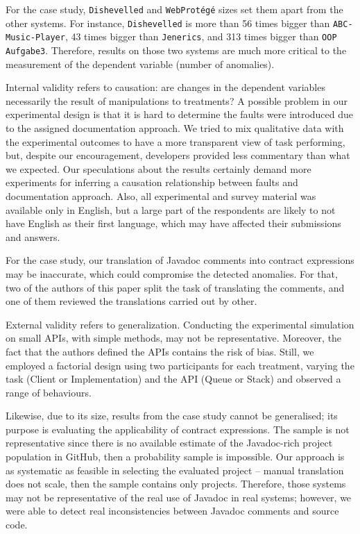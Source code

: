 
For the case study, \texttt{Dishevelled} and
\texttt{WebProt\'{e}g\'{e}} sizes set them apart from the other systems.
For instance, \texttt{Dishevelled} is more than 56 times bigger than \texttt{ABC-Music-Player}, 43
times bigger than \texttt{Jenerics}, and 313 times bigger than \texttt{OOP Aufgabe3}.
Therefore, results on those two systems are much more critical to the measurement of the dependent variable (number of anomalies).


Internal validity refers to causation: are changes in the dependent variables necessarily the result of manipulations to treatments? A possible problem in our experimental design is that it is hard to determine the faults were introduced due to the assigned documentation approach. We tried to mix qualitative data with the experimental outcomes to have a more transparent view of task performing, but, despite our encouragement, developers provided less commentary than what we expected. Our speculations about the results certainly demand more experiments for inferring a causation relationship between faults and documentation approach.
Also, all experimental and survey material was available only in English, but a large part of the respondents are likely to not have English as their first language, which may have affected their
submissions and answers.

For the case study, our translation of Javadoc comments into contract expressions may be inaccurate, which could compromise the detected anomalies. For that, two of the authors of this paper split the task of translating the comments, and one of them reviewed the translations carried out by other. 



External validity refers to generalization. 
Conducting the experimental simulation on small APIs, with simple methods, may not be representative. Moreover, the fact that the authors defined the APIs contains the risk of bias. Still, we employed a factorial design using two participants for each treatment, varying the task (Client or Implementation) and the API (Queue or Stack) and observed a range of behaviours. 

Likewise, due to its size, results from the case study cannot be generalised; its purpose is evaluating the applicability of contract expressions.
The sample is not representative since there is no available estimate of the Javadoc-rich project
population in GitHub, then a probability sample is impossible. 
Our approach is as systematic as feasible in selecting the evaluated project -- manual translation
does not scale, then the sample contains only \totalSystems{} projects.
Therefore, those systems may not be representative of the real use of Javadoc in real systems; however, we were able to detect real inconsistencies between Javadoc comments and source code.



